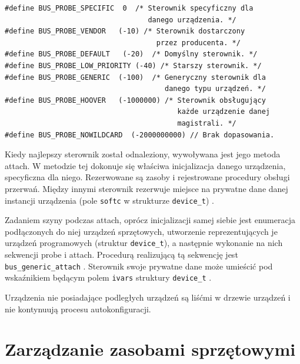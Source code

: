 \documentclass[shortabstract,inz]{iithesis}
\begin{document}
\begin{lstlisting}[caption=Zwracane wartości probe]
#define BUS_PROBE_SPECIFIC  0  /* Sterownik specyficzny dla 
                                  danego urządzenia. */
#define BUS_PROBE_VENDOR   (-10) /* Sterownik dostarczony
                                    przez producenta. */
#define BUS_PROBE_DEFAULT   (-20)  /* Domyślny sterownik. */
#define BUS_PROBE_LOW_PRIORITY (-40) /* Starszy sterownik. */ 
#define BUS_PROBE_GENERIC  (-100)  /* Generyczny sterownik dla 
                                      danego typu urządzeń. */
#define BUS_PROBE_HOOVER   (-1000000) /* Sterownik obsługujący
                                         każde urządzenie danej
                                         magistrali. */
#define BUS_PROBE_NOWILDCARD  (-2000000000) // Brak dopasowania.
\end{lstlisting}

Kiedy najlepszy sterownik został odnaleziony, wywoływana jest jego metoda attach.
W metodzie tej dokonuje się właściwa inicjalizacja danego urządzenia, specyficzna dla niego.
Rezerwowane są zasoby i rejestrowane procedury obsługi przerwań.
Między innymi sterownik rezerwuje miejsce na prywatne dane danej instancji 
urządzenia (pole \texttt{softc} w strukturze \texttt{device\_t}) \cite{man:softc}.

Zadaniem szyny podczas attach, oprócz inicjalizacji samej siebie jest 
enumeracja podłączonych do niej urządzeń sprzętowych, utworzenie reprezentujących
je urządzeń programowych (struktur \texttt{device\_t}), a następnie wykonanie na nich sekwencji
probe i attach.
Procedurą realizującą tą sekwencję jest \texttt{bus\_generic\_attach} \cite{man:bus_generic_attach_9}.
Sterownik swoje prywatne dane może umieścić pod wskaźnikiem będącym polem \texttt{ivars} struktury \texttt{device\_t} \cite{man:ivars}.


Urządzenia nie posiadające podległych urządzeń są liśćmi w drzewie urządzeń i nie kontynuują procesu autokonfiguracji.



\section{Zarządzanie zasobami sprzętowymi} %
\end{document}
